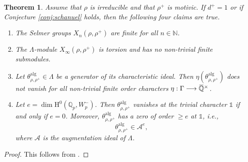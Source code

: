 \documentclass[12pt]{amsart}
\newcommand\bN{\mathbb{N}}
\newcommand\bQ{\mathbb{Q}}
\newcommand\cA{\mathcal{A}}
\newcommand{\ob}[1]{\mkern 1.5mu\overline{\mkern-1.5mu#1\mkern-1.5mu}\mkern 1.5mu}
\newcommand{\alg}{\textrm{alg}}
\newcommand{\HH}{\mathrm{H}}
\theoremstyle{defstyle}
\theoremstyle{thmstyle}
\newtheorem{theorem}[subsubsection]{Theorem}
\begin{document}
\begin{theorem} 
	Assume that $\rho$ is irreducible and that $\rho^+$ is motivic. If $d^+=1$ or if Conjecture \ref{conj:schanuel} holds, then the following four claims are true.
	\begin{enumerate}
		\item The Selmer groups $X_n(\rho,\rho^+)$ are finite for all $n\in\bN$.
		\item The $\Lambda$-module $X_\infty(\rho,\rho^+)$ is torsion and has no non-trivial finite submodules.
		\item Let $\theta^\alg_{\rho,\rho^+}\in\Lambda$ be a generator of its characteristic ideal. Then $\eta(\theta^\alg_{\rho,\rho^+})$ does not vanish for all non-trivial finite order characters $\eta :\Gamma \longrightarrow \ob{\bQ}^\times$.
		\item Let $e=\dim \HH^0(\bQ_p,W_p^-)$. Then $\theta^\alg_{\rho,\rho^+}$ vanishes at the trivial character $\mathds{1}$ if and only if $e=0$. Moreover, $\theta^\alg_{\rho,\rho^+}$ has a zero of order $\geq e$ at $\mathds{1}$, \textit{i.e.},  
		$$\theta^\alg_{\rho,\rho^+} \in \cA^{e},$$
		where $\cA$ is the augmentation ideal of $\Lambda$.
	\end{enumerate}
\end{theorem}
\begin{proof}
	This follows from \cite[Théorème 2.1.5]{maks}.
\end{proof}
\end{document}
